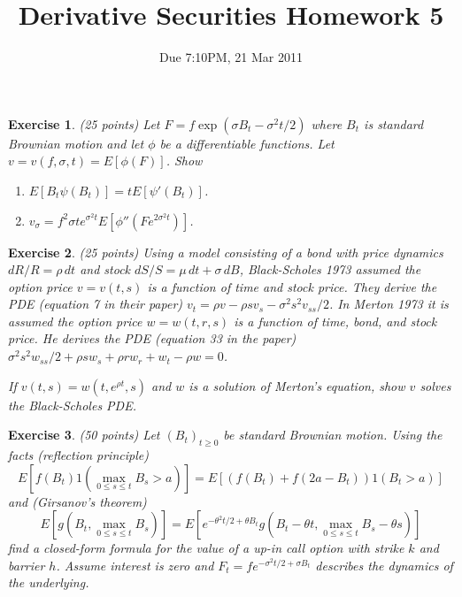 \documentclass[11pt,fleqn]{amsproc}
\newtheorem{xca}{Exercise}
\begin{document}
\title{Derivative Securities Homework 5}
\author{Due 7:10PM, 21 Mar 2011}

\maketitle

\begin{xca}{(25 points)}
Let $F = f\exp(\sigma B_t - \sigma^2t/2)$ where $B_t$ is
standard Brownian motion and let
$\phi$ be a differentiable functions. Let $v =
v(f,\sigma,t) = E[\phi(F)]$. Show
\begin{enumerate}
\item $E[B_t\psi(B_t)] = tE[\psi'(B_t)]$.
\item $v_\sigma = f^2\sigma te^{\sigma^2t}E[\phi''(Fe^{2\sigma^2t})]$.
\end{enumerate}
\end{xca}

\begin{xca}{(25 points)}
Using a model consisting of a bond with price dynamics
$dR/R = \rho\,dt$ and stock $dS/S = \mu\,dt + \sigma\,dB$,
Black-Scholes 1973 assumed the option price $v = v(t, s)$
is a function of time and stock price.
They derive the PDE (equation 7 in their paper)
$v_t = \rho v - \rho sv_s - \sigma^2 s^2 v_{ss}/2$. In Merton 1973
it is assumed the option price $w = w(t, r, s)$ is a function
of time, bond, and stock price. He derives the PDE (equation 33
in the paper)
$\sigma^2 s^2 w_{ss}/2 + \rho sw_s + \rho r w_r + w_t - \rho w = 0$.

If $v(t, s) = w(t, e^{\rho t}, s)$ and $w$ is a solution of
Merton's equation, show $v$ solves the Black-Scholes PDE.
\end{xca}
\begin{xca}{(50 points)}
Let $(B_t)_{t\ge0}$ be standard Brownian motion. Using the
facts (reflection principle)
\begin{equation*}
E[f(B_t)1(\max_{0\le s\le t}B_s > a)]
= E[(f(B_t) + f(2a - B_t))1(B_t > a)]
\end{equation*}
and (Girsanov's theorem)
\begin{equation*}
E[g(B_t, \max_{0\le s\le t}B_s)]
= E[e^{-\theta^2 t/2 + \theta B_t}
g(B_t - \theta t, \max_{0\le s\le t}B_s - \theta s)]
\end{equation*}
find a closed-form formula for the value of a up-in call option
with strike $k$ and barrier $h$.
Assume interest is zero and
$F_t = fe^{-\sigma^2 t/2 + \sigma B_t}$ describes the
dynamics of the underlying.
\end{xca}
\end{document}
